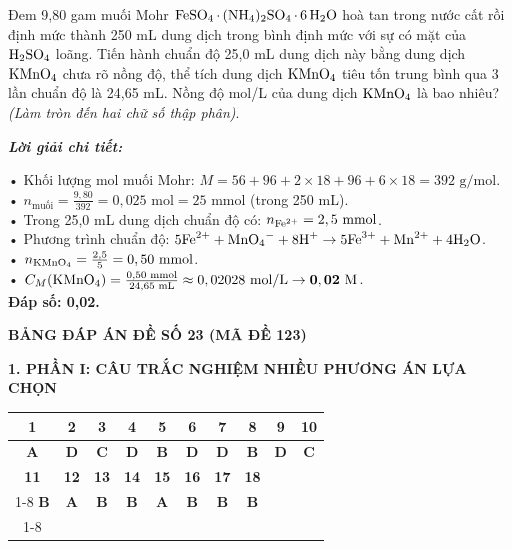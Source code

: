 \documentclass[11pt,a4paper]{article}
\def\loigiai#1{
\par\begingroup\color{blue!80!black}\small
\noindent\textbf{\textit{Lời giải chi tiết:}}\par
#1\par\endgroup}
\begin{document}
\begin{ex}
Đem 9,80 gam muối Mohr $\ce{FeSO4.(NH4)2SO4.6H2O}$ hoà tan trong nước cất rồi định mức thành 250 mL dung dịch trong bình định mức với sự có mặt của $\ce{H2SO4}$ loãng. Tiến hành chuẩn độ 25,0 mL dung dịch này bằng dung dịch $\ce{KMnO4}$ chưa rõ nồng độ, thể tích dung dịch $\ce{KMnO4}$ tiêu tốn trung bình qua 3 lần chuẩn độ là 24,65 mL. Nồng độ mol/L của dung dịch $\ce{KMnO4}$ là bao nhiêu? \textit{(Làm tròn đến hai chữ số thập phân)}.
\loigiai{
• Khối lượng mol muối Mohr: $M = 56 + 96 + 2 \times 18 + 96 + 6 \times 18 = 392\text{ g/mol}$.\\
• $n_{\text{muối}} = \frac{9,80}{392} = 0,025\text{ mol} = 25\text{ mmol}$ (trong 250 mL).\\
• Trong 25,0 mL dung dịch chuẩn độ có: $n_{\ce{Fe^2+}} = 2,5\text{ mmol}$.\\
• Phương trình chuẩn độ: $5\ce{Fe^2+} + \ce{MnO4-} + 8\ce{H+} \rightarrow 5\ce{Fe^3+} + \ce{Mn^2+} + 4\ce{H2O}$.\\
• $n_{\ce{KMnO4}} = \frac{2,5}{5} = 0,50\text{ mmol}$.\\
• $C_M(\ce{KMnO4}) = \frac{0,50\text{ mmol}}{24,65\text{ mL}} \approx 0,02028\text{ mol/L} \rightarrow \mathbf{0,02\text{ M}}$.\\
\textbf{Đáp số: 0,02.}}
\end{ex}




\newpage
\begin{center}
	\textbf{\color{hfRed}\Large BẢNG ĐÁP ÁN ĐỀ SỐ 23 (MÃ ĐỀ 123)}
\end{center}

\vspace{0.2cm}
\noindent\textbf{\large 1. PHẦN I: CÂU TRẮC NGHIỆM NHIỀU PHƯƠNG ÁN LỰA CHỌN}\\
\begin{center}
\renewcommand{\arraystretch}{1.2}
\begin{tabular}{|c|c|c|c|c|c|c|c|c|c|}
\hline
\textbf{1} & \textbf{2} & \textbf{3} & \textbf{4} & \textbf{5} & \textbf{6} & \textbf{7} & \textbf{8} & \textbf{9} & \textbf{10} \\
\hline
\textbf{\color{hfRed}A} & \textbf{\color{hfRed}D} & \textbf{\color{hfRed}C} & \textbf{\color{hfRed}D} & \textbf{\color{hfRed}B} & \textbf{\color{hfRed}D} & \textbf{\color{hfRed}D} & \textbf{\color{hfRed}B} & \textbf{\color{hfRed}D} & \textbf{\color{hfRed}C} \\
\hline
\hline
\textbf{11} & \textbf{12} & \textbf{13} & \textbf{14} & \textbf{15} & \textbf{16} & \textbf{17} & \textbf{18} & \multicolumn{2}{c|}{} \\
\cline{1-8}
\textbf{\color{hfRed}B} & \textbf{\color{hfRed}A} & \textbf{\color{hfRed}B} & \textbf{\color{hfRed}B} & \textbf{\color{hfRed}A} & \textbf{\color{hfRed}B} & \textbf{\color{hfRed}B} & \textbf{\color{hfRed}B} & \multicolumn{2}{c|}{} \\
\cline{1-8}
\end{tabular}
\end{center}
\end{document}

